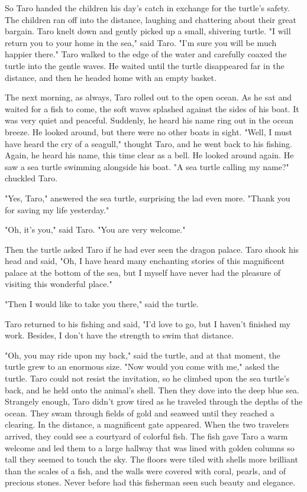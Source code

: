 So Taro handed the children his day's catch in exchange for the turtle's safety. The children ran off into the distance, laughing and chattering about their great bargain. Taro knelt down and gently picked up a small, shivering turtle. "I will return you to your home in the sea," said Taro. "I'm sure you will be much happier there." Taro walked to the edge of the water and carefully coaxed the turtle into the gentle waves. He waited until the turtle disappeared far in the distance, and then he headed home with an empty basket.

The next morning, as always, Taro rolled out to the open ocean. As he sat and waited for a fish to come, the soft waves splashed against the sides of his boat. It was very quiet and peaceful. Suddenly, he heard his name ring out in the ocean breeze. He looked around, but there were no other boats in sight. "Well, I must have heard the cry of a seagull," thought Taro, and he went back to his fishing. Again, he heard his name, this time clear as a bell. He looked around again. He saw a sea turtle swimming alongside his boat. "A sea turtle calling my name?" chuckled Taro.

"Yes, Taro," answered the sea turtle, surprising the lad even more. "Thank you for saving my life yesterday."

"Oh, it's you," said Taro. "You are very welcome."

Then the turtle asked Taro if he had ever seen the dragon palace. Taro shook his head and said, "Oh, I have heard many enchanting stories of this magnificent palace at the bottom of the sea, but I myself have never had the pleasure of visiting this wonderful place."

"Then I would like to take you there," said the turtle.

Taro returned to his fishing and said, "I'd love to go, but I haven't finished my work. Besides, I don't have the strength to swim that distance.

"Oh, you may ride upon my back," said the turtle, and at that moment, the turtle grew to an enormous size. "Now would you come with me," asked the turtle. Taro could not resist the invitation, so he climbed upon the sea turtle's back, and he held onto the animal's shell. Then they dove into the deep blue sea. Strangely enough, Taro didn't grow tired as he traveled through the depths of the ocean. They swam through fields of gold and seaweed until they reached a clearing. In the distance, a magnificent gate appeared. When the two travelers arrived, they could see a courtyard of colorful fish. The fish gave Taro a warm welcome and led them to a large hallway that was lined with golden columns so tall they seemed to touch the sky. The floors were tiled with shells more brilliant than the scales of a fish, and the walls were covered with coral, pearls, and of precious stones. Never before had this fisherman seen such beauty and elegance.

